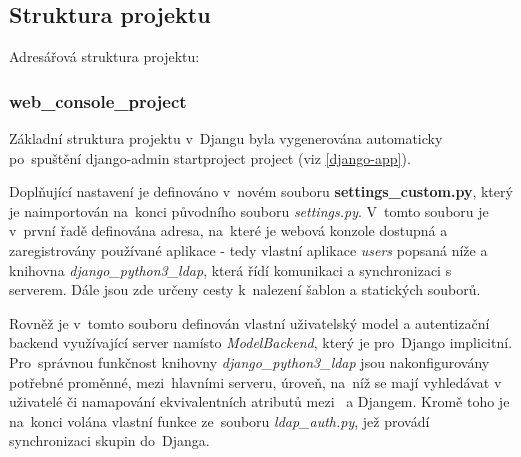 \newpage
\subsection{Struktura projektu}
Adresářová struktura projektu:

\subsubsection{web\_console\_project}
Základní struktura projektu v~Djangu byla vygenerována automaticky 
po~spuštění \textsf{django-admin startproject project} (viz
\ref{django-app}).

Doplňující nastavení je definováno v~novém souboru
\textbf{settings\_custom.py}, který je naimportován na~konci původního
souboru \textit{settings.py}. V~tomto souboru je v~první řadě
definována  adresa, na~které je webová konzole dostupná a
zaregistrovány používané aplikace - tedy vlastní aplikace
\textit{users} popsaná níže a knihovna \textit{django\_python3\_ldap},
která řídí komunikaci a synchronizaci s~ serverem. Dále jsou
zde určeny cesty k~nalezení šablon a statických souborů.

Rovněž je v~tomto souboru definován vlastní uživatelský model a
autentizační backend využívající  server namísto
\textit{ModelBackend}, který je pro~Django implicitní. Pro~správnou
funkčnost knihovny \textit{django\_python3\_ldap} jsou nakonfi\-gurovány
potřebné proměnné, mezi~hlavními   serveru, úroveň,
na~níž se mají vyhledávat v~ uživatelé či namapování
ekvivalentních atributů mezi~ a Djangem. Kromě toho je 
na~konci volána vlastní funkce ze~souboru \textit{ldap\_auth.py}, jež
provádí synchronizaci skupin do~Djanga.

